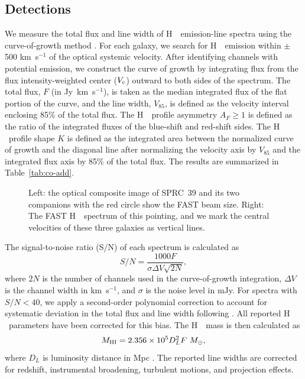 \documentclass[twocolumn]{aastex631}
\def\HI{H\,  {\textsc{\romannumeral 1}}}
\begin{document}
\subsection{Detections}
\label{subsec:dect}
We measure the total flux and line width of \HI\ emission-line spectra using the curve-of-growth method \citep{Yu2020ApJ...898..102Y, Yu2022ApJS..261...21Y}. For each galaxy, we search for \HI\ emission within $\pm$500 km~s$^{-1}$ of the optical systemic velocity. After identifying channels with potential emission, we construct the curve of growth by integrating flux from the flux intensity-weighted center ($V_{\rm c}$) outward to both sides of the spectrum. The total flux, $F$ (in Jy~km~s$^{-1}$), is taken as the median integrated flux of the flat portion of the curve, and the line width, $V_{85}$, is defined as the velocity interval enclosing 85\% of the total flux. The \HI\ profile asymmetry $A_F \geq 1$ is defined as the ratio of the integrated fluxes of the blue-shift and red-shift sides. The \HI\ profile shape $K$ is defined as the integrated area between the normalized curve of growth and the diagonal line after normalizing the velocity axis by $V_{85}$ and the integrated flux axis by 85\% of the total flux. The results are summarized in Table~\ref{tab:co-add}.


\begin{figure}[!hbt]
\caption{Left: the optical composite image of SPRC~39 and its two companions with the red circle show the FAST beam size. Right: The FAST \HI\ spectrum of this pointing, and we mark the central velocities of these three galaxies as vertical lines.
}
\label{fig:absorption}
\end{figure}

The signal-to-noise ratio (S/N) of each spectrum is calculated as
\begin{equation}
S/N = \frac{1000 F}{\sigma \Delta V \sqrt{2N}},  
\end{equation}
where $2N$ is the number of channels used in the curve-of-growth integration, $\Delta V$ is the channel width in km\,  s$^{-1}$, and $\sigma$ is the noise level in mJy. For spectra with $S/N < 40$, we apply a second-order polynomial correction to account for systematic deviation in the total flux and line width following \citet{Yu2022ApJS..261...21Y}. All reported \HI\ parameters have been corrected for this bias. The \HI\ mass is then calculated as
\begin{equation}
M_{\rm HI} = 2.356\times10^5 D_L^2 F\ M_\odot,  
\end{equation}
where $D_{L}$ is luminosity distance in Mpc \citep{Roberts1962}. The reported line widths are corrected for redshift, instrumental broadening, turbulent motions, and projection effects.
\end{document}
